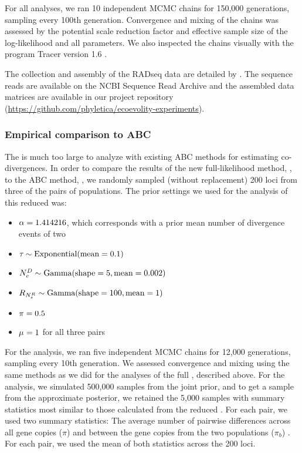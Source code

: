 For all analyses, we ran 10 independent MCMC chains for 150,000 generations,
sampling every 100th generation.
Convergence and mixing of the chains was assessed by the potential scale
reduction factor
\citep[PSRF; the square root of Equation 1.1 in][]{Brooks1998}
and effective sample size
\citep[ESS;][]{Gong2014}
of the log-likelihood and all parameters.
We also inspected the chains visually with the program Tracer version 1.6
\citep{Tracer16}.

The collection and assembly of the  RADseq data are detailed by
\citet{Oaks2018paic}.
The sequence reads are available on the NCBI Sequence Read Archive
and the assembled data matrices are available in our project repository
(\url{https://github.com/phyletica/ecoevolity-experiments}).

\subsubsection{Empirical comparison to ABC}
The  \dataset is much too large to analyze with existing ABC
methods for estimating co-divergences.
In order to compare the results of the new full-likelihood method, \ecoevolity,
to the ABC method, \dppmsbayes, we randomly sampled (without replacement) 200
loci from three of the pairs of  populations.
The prior settings we used for the \ecoevolity analysis of this reduced
\dataset was:
\begin{itemize}
    \item $\concentration = 1.414216$, which corresponds with a prior mean
        number of divergence events of two
    \item $\divtime \sim \dexponential{0.1}$
    \item $\epopsize[\descendantpopindex{}] \sim \dgamma{5}{0.002}$
    \item $\rootrelativepopsize \sim \dgamma{100}{1}$
    \item $\gfreq = 0.5$
    \item $\murate = 1$ for all three pairs
\end{itemize}

For the \ecoevolity analysis, we ran five independent MCMC chains for 12,000
generations, sampling every 10th generation.
We assessed convergence and mixing using the same methods as we did for the
analyses of the full  \dataset, described above.
For the \dppmsbayes analysis, we simulated 500,000 samples from the joint
prior, and to get a sample from the approximate posterior, we retained the
5,000 samples with summary statistics most similar to those calculated
from the reduced  \dataset.
For each pair, we used two summary statistics:
The average number of pairwise differences across all gene copies ($\pi$) and
between the gene copies from the two populations ($\pi_b$) \citep{NeiLi1979}.
For each pair, we used the mean of both statistics across the 200 loci.



